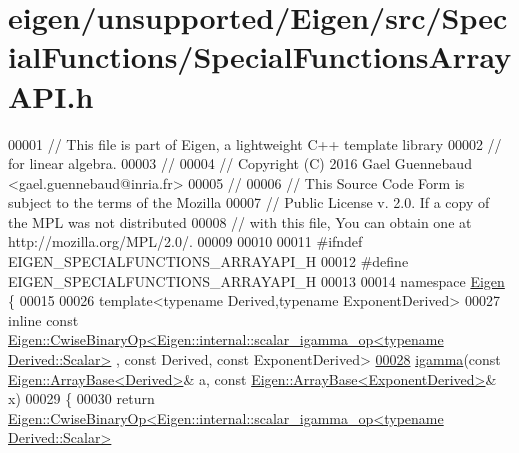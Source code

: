 \hypertarget{eigen_2unsupported_2_eigen_2src_2_special_functions_2_special_functions_array_a_p_i_8h_source}{}\section{eigen/unsupported/\+Eigen/src/\+Special\+Functions/\+Special\+Functions\+Array\+A\+PI.h}
\label{eigen_2unsupported_2_eigen_2src_2_special_functions_2_special_functions_array_a_p_i_8h_source}

\begin{DoxyCode}
00001 \textcolor{comment}{// This file is part of Eigen, a lightweight C++ template library}
00002 \textcolor{comment}{// for linear algebra.}
00003 \textcolor{comment}{//}
00004 \textcolor{comment}{// Copyright (C) 2016 Gael Guennebaud <gael.guennebaud@inria.fr>}
00005 \textcolor{comment}{//}
00006 \textcolor{comment}{// This Source Code Form is subject to the terms of the Mozilla}
00007 \textcolor{comment}{// Public License v. 2.0. If a copy of the MPL was not distributed}
00008 \textcolor{comment}{// with this file, You can obtain one at http://mozilla.org/MPL/2.0/.}
00009 
00010 
00011 \textcolor{preprocessor}{#ifndef EIGEN\_SPECIALFUNCTIONS\_ARRAYAPI\_H}
00012 \textcolor{preprocessor}{#define EIGEN\_SPECIALFUNCTIONS\_ARRAYAPI\_H}
00013 
00014 \textcolor{keyword}{namespace }\hyperlink{namespace_eigen}{Eigen} \{
00015 
00026 \textcolor{keyword}{template}<\textcolor{keyword}{typename} Derived,\textcolor{keyword}{typename} ExponentDerived>
00027 \textcolor{keyword}{inline} \textcolor{keyword}{const} 
      \hyperlink{group___core___module_class_eigen_1_1_cwise_binary_op}{Eigen::CwiseBinaryOp<Eigen::internal::scalar\_igamma\_op<typename Derived::Scalar>}
      , \textcolor{keyword}{const} Derived, \textcolor{keyword}{const} ExponentDerived>
\hyperlink{namespace_eigen_af5aa651137636b1cdbd27de1cfe91148}{00028} \hyperlink{namespace_eigen_af5aa651137636b1cdbd27de1cfe91148}{igamma}(\textcolor{keyword}{const} \hyperlink{group___core___module_class_eigen_1_1_array_base}{Eigen::ArrayBase<Derived>}& a, \textcolor{keyword}{const} 
      \hyperlink{group___core___module_class_eigen_1_1_array_base}{Eigen::ArrayBase<ExponentDerived>}& x)
00029 \{
00030   \textcolor{keywordflow}{return} 
      \hyperlink{group___core___module_class_eigen_1_1_cwise_binary_op}{Eigen::CwiseBinaryOp<Eigen::internal::scalar\_igamma\_op<typename Derived::Scalar>}

\end{DoxyCode}

